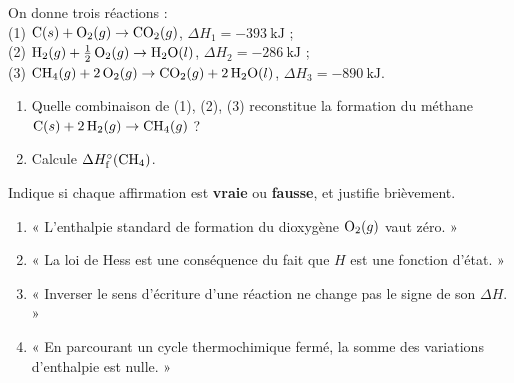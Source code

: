 \documentclass[11pt,a4paper]{article}
\begin{document}
\begin{exo}
On donne trois réactions :\\
\hspace*{1em}(1) $\ce{C}(s) + \ce{O2}(g) \rightarrow \ce{CO2}(g)$, \; $\Delta H_1 = \qty{-393}{\kilo\joule}$ ;\\
\hspace*{1em}(2) $\ce{H2}(g) + \tfrac12\,\ce{O2}(g) \rightarrow \ce{H2O}(l)$, \; $\Delta H_2 = \qty{-286}{\kilo\joule}$ ;\\
\hspace*{1em}(3) $\ce{CH4}(g) + 2\,\ce{O2}(g) \rightarrow \ce{CO2}(g) + 2\,\ce{H2O}(l)$, \; $\Delta H_3 = \qty{-890}{\kilo\joule}$.
\begin{enumerate}[label=\alph*)]
  \item Quelle combinaison de (1), (2), (3) reconstitue la formation du méthane $\ce{C}(s) + 2\,\ce{H2}(g) \rightarrow \ce{CH4}(g)$ ?
  \item Calcule $\Delta H^\circ_{\text{f}}(\ce{CH4})$.
\end{enumerate}
\end{exo}

\begin{exo}
Indique si chaque affirmation est \textbf{vraie} ou \textbf{fausse}, et justifie brièvement.
\begin{enumerate}[label=\alph*)]
  \item « L'enthalpie standard de formation du dioxygène $\ce{O2}(g)$ vaut zéro. »
  \item « La loi de Hess est une conséquence du fait que $H$ est une fonction d'état. »
  \item « Inverser le sens d'écriture d'une réaction ne change pas le signe de son $\Delta H$. »
  \item « En parcourant un cycle thermochimique fermé, la somme des variations d'enthalpie est nulle. »
\end{enumerate}
\end{exo}
\end{document}
